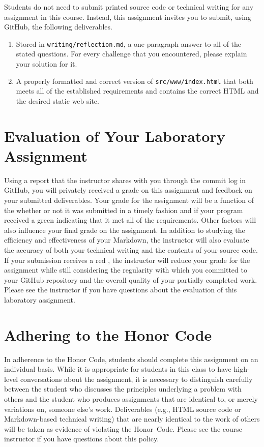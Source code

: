\documentclass[11pt]{article}
\newcommand{\mainprogramsource}{\lstinline{src/www/index.html}}
\newcommand{\reflection}{\lstinline{writing/reflection.md}}
\newcommand{\checkmark}{\ding{51}}
\newcommand{\naughtmark}{\ding{55}}
\begin{document}
\noindent Students do not need to submit printed source code or technical writing for any assignment in this course.
Instead, this assignment invites you to submit, using GitHub, the following deliverables.

\begin{enumerate}

\setlength{\itemsep}{0in}

\item Stored in \reflection{}, a one-paragraph answer to all of the stated
  questions. For every challenge that you encountered, please explain your
  solution for it.

\item A properly formatted and correct version of \mainprogramsource{} that both
  meets all of the established requirements and contains the correct HTML and
  the desired static web site.

\end{enumerate}

\section*{Evaluation of Your Laboratory Assignment}

Using a report that the instructor shares with you through the commit log in GitHub, you will privately received a grade
on this assignment and feedback on your submitted deliverables. Your grade for the assignment will be a function of the
whether or not it was submitted in a timely fashion and if your program received a green \checkmark{} indicating that it
met all of the requirements. Other factors will also influence your final grade on the assignment. In addition to
studying the efficiency and effectiveness of your Markdown, the instructor will also evaluate the accuracy of both your
technical writing and the contents of your source code. If your submission receives a red \naughtmark{}, the instructor
will reduce your grade for the assignment while still considering the regularity with which you committed to your GitHub
repository and the overall quality of your partially completed work. Please see the instructor if you have questions
about the evaluation of this laboratory assignment.

\section*{Adhering to the Honor Code}

In adherence to the Honor Code, students should complete this assignment on an individual basis. While it is appropriate
for students in this class to have high-level conversations about the assignment, it is necessary to distinguish
carefully between the student who discusses the principles underlying a problem with others and the student who produces
assignments that are identical to, or merely variations on, someone else's work. Deliverables (e.g., HTML source code or
Markdown-based technical writing) that are nearly identical to the work of others will be taken as evidence of violating
the \mbox{Honor Code}. Please see the course instructor if you have questions about this policy.
\end{document}
